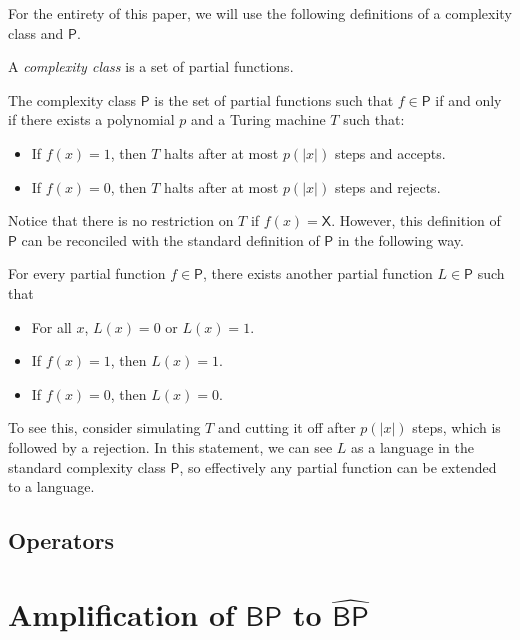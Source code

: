\documentclass[11pt]{article}
\newcommand{\bp}{\textsf{BP}}
\newcommand{\strongbp}{\widehat{\textsf{BP}}}
\newcommand{\p}{\textsf{P}}
\newcommand{\x}{\textsf{X}}
\begin{document}
For the entirety of this paper, we will use the following definitions of a complexity class and $\p$.

\begin{definition}\label{complexityclass}
A \emph{complexity class} is a set of partial functions.
\end{definition}

\begin{definition}\label{p}
The complexity class $\p$ is the set of partial functions such that $f \in \p$ if and only if there exists a polynomial $p$ and a Turing machine $T$ such that:
\begin{itemize}
\item If $f(x) = 1$, then $T$ halts after at most $p(|x|)$ steps and accepts.
\item If $f(x) = 0$, then $T$ halts after at most $p(|x|)$ steps and rejects.
\end{itemize}
\end{definition}

Notice that there is no restriction on $T$ if $f(x) = \x$. However, this definition of $\p$ can be reconciled with the standard definition of $\p$ in the following way.

\begin{remark}
For every partial function $f \in \p$, there exists another partial function $L \in \p$ such that
\begin{itemize}
\item For all $x$, $L(x) = 0$ or $L(x) = 1$.
\item If $f(x) = 1$, then $L(x) = 1$.
\item If $f(x) = 0$, then $L(x) = 0$.
\end{itemize}
\end{remark}

To see this, consider simulating $T$ and cutting it off after $p(|x|)$ steps, which is followed by a rejection. In this statement, we can see $L$ as a language in the standard complexity class $\p$, so effectively any partial function can be extended to a language.

\subsection{Operators}

\section{Amplification of $\bp$ to $\strongbp$}
\end{document}
